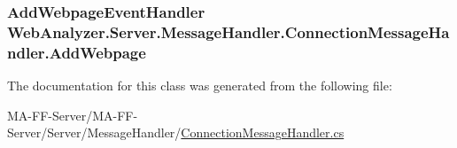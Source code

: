 \subsubsection[{Add\+Webpage}]{\setlength{\rightskip}{0pt plus 5cm}Add\+Webpage\+Event\+Handler Web\+Analyzer.\+Server.\+Message\+Handler.\+Connection\+Message\+Handler.\+Add\+Webpage}\label{class_web_analyzer_1_1_server_1_1_message_handler_1_1_connection_message_handler_a4a1e2b8d5b77a7559db92b1e1a07aed9}


The documentation for this class was generated from the following file\+:\begin{DoxyCompactItemize}
\item 
M\+A-\/\+F\+F-\/\+Server/\+M\+A-\/\+F\+F-\/\+Server/\+Server/\+Message\+Handler/\hyperlink{_connection_message_handler_8cs}{Connection\+Message\+Handler.\+cs}\end{DoxyCompactItemize}
